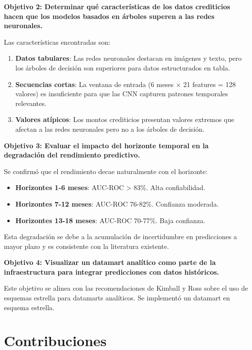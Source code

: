 \textbf{Objetivo 2: Determinar qué características de los datos crediticios hacen que los modelos basados en árboles superen a las redes neuronales.}

Las características encontradas son:

\begin{enumerate}
    \item \textbf{Datos tabulares}: Las redes neuronales destacan en imágenes y texto, pero los árboles de decisión son superiores para datos estructurados en tabla.
    \item \textbf{Secuencias cortas}: La ventana de entrada (6 meses × 21 features = 128 valores) es insuficiente para que las CNN capturen patrones temporales relevantes.
    \item \textbf{Valores atípicos}: Los montos crediticios presentan valores extremos que afectan a las redes neuronales pero no a los árboles de decisión.
\end{enumerate}

\textbf{Objetivo 3: Evaluar el impacto del horizonte temporal en la degradación del rendimiento predictivo.}

Se confirmó que el rendimiento decae naturalmente con el horizonte:

\begin{itemize}
    \item \textbf{Horizontes 1-6 meses}: AUC-ROC > 83\%. Alta confiabilidad.
    \item \textbf{Horizontes 7-12 meses}: AUC-ROC 76-82\%. Confianza moderada.
    \item \textbf{Horizontes 13-18 meses}: AUC-ROC 70-77\%. Baja confianza.
\end{itemize}

Esta degradación se debe a la acumulación de incertidumbre en predicciones a mayor plazo y es consistente con la literatura existente.

\textbf{Objetivo 4: Visualizar un datamart analítico como parte de la infraestructura para integrar predicciones con datos históricos.}

Este objetivo se alinea con las recomendaciones de Kimball y Ross \cite{kimball2013datawarehouse} sobre el uso de esquemas estrella para datamarts analíticos. Se implementó un datamart en esquema estrella.

\section{Contribuciones}

